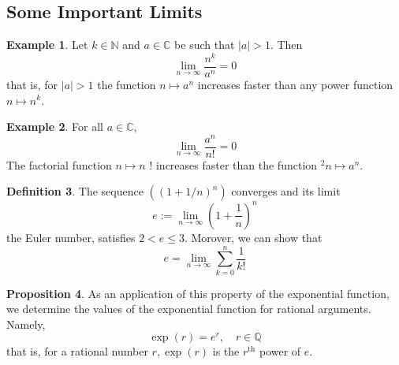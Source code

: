 \documentclass[12pt,a4paper]{book}
\theoremstyle{definition}
\newtheorem{defn}{Definition}[section]
\newtheorem{prop}[defn]{Proposition}
\newtheorem{exam}[defn]{Example}
\begin{document}
\subsection{Some Important Limits}
\begin{exam}
    Let $k \in \mathbb{N}$ and $a \in \mathbb{C}$ be such that $|a|>1$. Then
    $$
    \lim _{n \rightarrow \infty} \frac{n^k}{a^n}=0
    $$
    that is, for $|a|>1$ the function $n \mapsto a^n$ increases faster than any power function $n \mapsto n^k$.
\end{exam}
\begin{exam}
    For all $a \in \mathbb{C}$,
    $$
    \lim _{n \rightarrow \infty} \frac{a^n}{n!}=0
    $$
    The factorial function $n \mapsto n$ ! increases faster than the function ${ }^2 n \mapsto a^n$.
\end{exam}
\begin{defn}
    The sequence $\left((1+1 / n)^n\right)$ converges and its limit
    $$
    e:=\lim _{n \rightarrow \infty}\left(1+\frac{1}{n}\right)^n
    $$
    the Euler number, satisfies $2<e \leq 3$.
    Morover, we can show that 
    $$  
    e=\lim _{n \rightarrow \infty} \sum_{k=0}^n \frac{1}{k!}
    $$
\end{defn}
\begin{prop}
    As an application of this property of the exponential function, we determine the values of the exponential function for rational arguments. Namely,
    $$
    \exp (r)=e^r, \quad r \in \mathbb{Q}
    $$
    that is, for a rational number $r, \exp (r)$ is the $r^{\mathrm{th}}$ power of $e$.
\end{prop}
\end{document}
